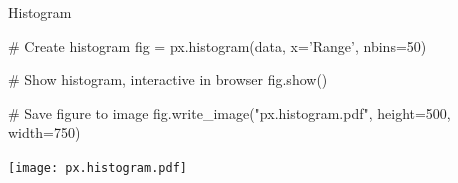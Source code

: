 \documentclass[ignorenonframetext,xcolor=x11names]{beamer}
\begin{document}
\begin{frame}[fragile]{Histogram}
\begin{pythoncode}
# Create histogram
fig = px.histogram(data, x='Range', nbins=50)

# Show histogram, interactive in browser
fig.show()

# Save figure to image
fig.write_image("px.histogram.pdf", height=500, width=750)
\end{pythoncode}
\begin{center}
    \texttt{[image: px.histogram.pdf]}
\end{center}
\end{frame}






\end{document}
